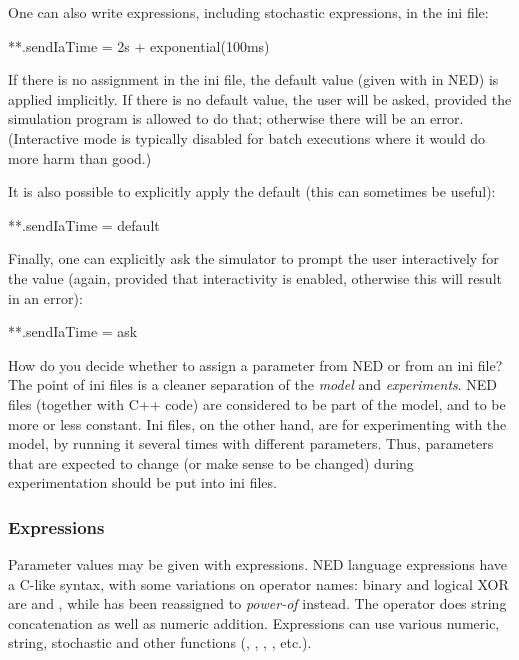 One can also write expressions, including stochastic expressions, in the ini file:

\begin{inifile}
**.sendIaTime = 2s + exponential(100ms)
\end{inifile}

If there is no assignment in the ini file, the default value (given with
 in NED) is applied implicitly. If there is no default
value, the user will be asked, provided the simulation program is allowed
to do that; otherwise there will be an error. (Interactive mode is
typically disabled for batch executions where it would do more harm than
good.)

It is also possible to explicitly apply the default (this can sometimes
be useful):

\begin{inifile}
**.sendIaTime = default
\end{inifile}

Finally, one can explicitly ask the simulator to prompt the user interactively
for the value (again, provided that interactivity is enabled, otherwise
this will result in an error):

\begin{inifile}
**.sendIaTime = ask
\end{inifile}

\begin{note}
    How do you decide whether to assign a parameter from NED or from an ini
    file? The point of ini files is a cleaner separation of the \textit{model}
    and \textit{experiments}. NED files (together with C++ code) are considered
    to be part of the model, and to be more or less constant. Ini files, on
    the other hand, are for experimenting with the model, by running it
    several times with different parameters. Thus, parameters that are expected
    to change (or make sense to be changed) during experimentation should be
    put into ini files.
\end{note}


\subsubsection{Expressions}

Parameter values may be given with expressions. NED language expressions
have a C-like syntax, with some variations on operator names: binary and
logical XOR are \ttt{\#} and \ttt{\#\#}, while \ttt{\^} has been reassigned
to \textit{power-of} instead. The \ttt{+} operator does string
concatenation as well as numeric addition. Expressions can use various
numeric, string, stochastic and other functions (, ,
, , etc.).

